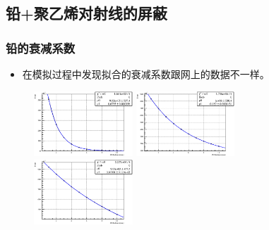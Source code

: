 \documentclass{beamer}
\newcommand{\liuhao}{\fontsize{7.875pt}{\baselineskip}\selectfont}
\begin{document}
\begin{CJK*}{UTF8}{gkai}
  \section{铅+聚乙烯对射线的屏蔽}
  \begin{frame}\frametitle{铅的衰减系数}
    \begin{itemize}
      \item \liuhao 在模拟过程中发现拟合的衰减系数跟网上的数据不一样。
    \end{itemize}
    \begin{figure}[ht]
      \includegraphics[width=0.33\textwidth]{matPb250kevGammaMu.eps}
      \includegraphics[width=0.33\textwidth]{matPb500kevGammaMu.eps}
      \includegraphics[width=0.33\textwidth]{matPb1MevGammaMu.eps}
      

\end{figure}
\end{frame}
\end{CJK*}
\end{document}

